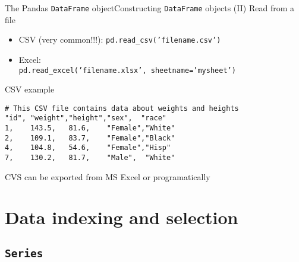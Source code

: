 \documentclass[10pt,compress]{beamer} %
\begin{document}
\begin{frame}[fragile]{The Pandas \texttt{DataFrame} object}{Constructing \texttt{DataFrame} objects (II)}
	Read from a file
	\begin{itemize}
		\item CSV (very common!!!): \texttt{pd.read\_csv('filename.csv')}
		\item Excel:\\
		\texttt{pd.read\_excel('filename.xlsx', sheetname='mysheet')}
	\end{itemize}

	\begin{exampleblock}{CSV example}
		\begin{lstlisting}
# This CSV file contains data about weights and heights
"id", "weight","height","sex",  "race"
1,    143.5,   81.6,    "Female","White"
2,    109.1,   83.7,    "Female","Black"
4,    104.8,   54.6,    "Female","Hisp"
7,    130.2,   81.7,    "Male",  "White"
\end{lstlisting}
	\end{exampleblock}
	CVS can be exported from MS Excel or programatically
\end{frame}

\section{Data indexing and selection}
\subsection{\texttt{Series}}
\end{document}
